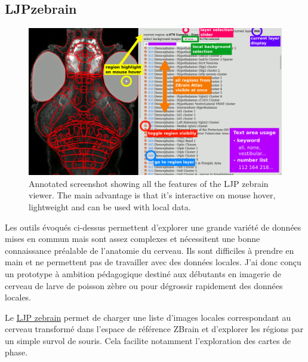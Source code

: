 

\subsection{LJPzebrain}

\begin{figure}
\centering
\includegraphics[width=\textwidth]{./files/LJPzebrain_screenshot.png}
\caption{Annotated screenshot showing all the features of the LJP zebrain viewer. The main advantage is that it's interactive on mouse hover, lightweight and can be used with local data.}
\end{figure}

Les outils évoqués ci-dessus permettent d'explorer une grande variété de données mises en commun mais sont assez complexes et nécessitent une bonne connaissance préalable de l'anatomie du cerveau. Ils sont difficiles à prendre en main et ne permettent pas de travailler avec des données locales. J'ai donc conçu un prototype à ambition pédagogique destiné aux débutants en imagerie de cerveau de larve de poisson zèbre ou pour dégrossir rapidement des données locales.

Le \href{https://github.com/LJPZebra/zebrain}{LJP zebrain} permet de charger une liste d'images locales correspondant au cerveau transformé dans l'espace de référence ZBrain et d'explorer les régions par un simple survol de souris. Cela facilite notamment l'exploration des cartes de phase.





